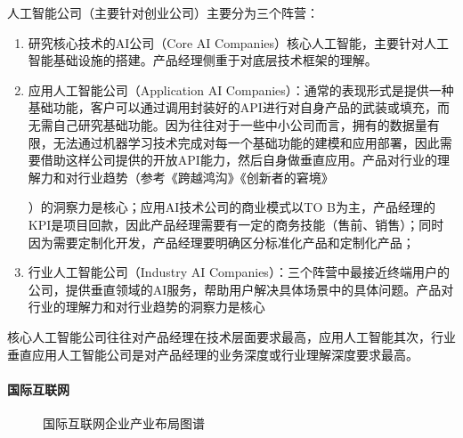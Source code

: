 \documentclass[letterpaper,11pt,english]{sphinxmanual}
\begin{document}
人工智能公司（主要针对创业公司）主要分为三个阵营：%
\begin{footnote}[651]\sphinxAtStartFootnote
{}
%
\end{footnote}
\begin{enumerate}
%
\item {} 
研究核心技术的AI公司（Core AI
Companies）核心人工智能，主要针对人工智能基础设施的搭建。产品经理侧重于对底层技术框架的理解。

\item {} 
应用人工智能公司（Application AI
Companies）：通常的表现形式是提供一种基础功能，客户可以通过调用封装好的API进行对自身产品的武装或填充，而无需自己研究基础功能。因为往往对于一些中小公司而言，拥有的数据量有限，无法通过机器学习技术完成对每一个基础功能的建模和应用部署，因此需要借助这样公司提供的开放API能力，然后自身做垂直应用。产品对行业的理解力和对行业趋势（参考《跨越鸿沟》《创新者的窘境》%
\begin{footnote}[652]\sphinxAtStartFootnote
{}
%
\end{footnote}）的洞察力是核心；应用AI技术公司的商业模式以TO
B为主，产品经理的KPI是项目回款，因此产品经理需要有一定的商务技能（售前、销售）；同时因为需要定制化开发，产品经理要明确区分标准化产品和定制化产品；

\item {} 
行业人工智能公司（Industry AI
Companies）：三个阵营中最接近终端用户的公司，提供垂直领域的AI服务，帮助用户解决具体场景中的具体问题。产品对行业的理解力和对行业趋势的洞察力是核心

\end{enumerate}

核心人工智能公司往往对产品经理在技术层面要求最高，应用人工智能其次，行业垂直应用人工智能公司是对产品经理的业务深度或行业理解深度要求最高。


\paragraph{国际互联网}
\label{\detokenize{chapter_project/AI_company:id3}}
\begin{figure}[H]
\centering
\capstart

\noindent{}
\caption{国际互联网企业产业布局图谱\sphinxfootnotemark[653]}\label{\detokenize{chapter_project/AI_company:id19}}\end{figure}
%
\begin{footnotetext}[653]\sphinxAtStartFootnote
{}
%
\end{footnotetext}\ignorespaces 
\end{document}

